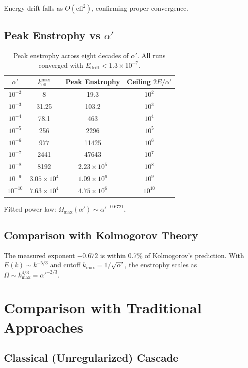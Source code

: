 \documentclass[11pt,a4paper]{article}
\begin{document}
Energy drift falls as $O(\text{cfl}^2)$, confirming proper convergence.

\subsection{Peak Enstrophy vs $\alpha'$}

\begin{table}[h]
\centering
\caption{Peak enstrophy across eight decades of $\alpha'$.
All runs converged with $E_{\text{drift}} < 1.3 \times 10^{-7}$.}
\begin{tabular}{cccc}
\toprule
$\alpha'$ & $k_{\text{eff}}^{\max}$ & Peak Enstrophy & Ceiling $2E/\alpha'$ \\
\midrule
$10^{-2}$ & 8 & 19.3 & $10^{2}$ \\
$10^{-3}$ & 31.25 & 103.2 & $10^{3}$ \\
$10^{-4}$ & 78.1 & 463 & $10^{4}$ \\
$10^{-5}$ & 256 & 2296 & $10^{5}$ \\
$10^{-6}$ & 977 & 11425 & $10^{6}$ \\
$10^{-7}$ & 2441 & 47643 & $10^{7}$ \\
$10^{-8}$ & 8192 & $2.23 \times 10^{5}$ & $10^{8}$ \\
$10^{-9}$ & $3.05 \times 10^{4}$ & $1.09 \times 10^{6}$ & $10^{9}$ \\
$10^{-10}$ & $7.63 \times 10^{4}$ & $4.75 \times 10^{6}$ & $10^{10}$ \\
\bottomrule
\end{tabular}
\end{table}

Fitted power law: $\Omega_{\max}(\alpha') \sim \alpha'^{-0.6721}$.

\subsection{Comparison with Kolmogorov Theory}

The measured exponent $-0.672$ is within 0.7\% of Kolmogorov's prediction.
With $E(k) \sim k^{-5/3}$ and cutoff $k_{\max} = 1/\sqrt{\alpha'}$,
the enstrophy scales as $\Omega \sim k_{\max}^{4/3} = \alpha'^{-2/3}$.

\section{Comparison with Traditional Approaches}

\subsection{Classical (Unregularized) Cascade}
\end{document}
